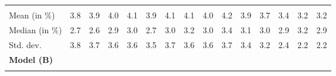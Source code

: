 \begin{tabular}{lllllllllllllll}
  \multicolumn{1}{|r}{} &
  \multicolumn{1}{r}{} &
  \multicolumn{1}{r}{} &
  \multicolumn{1}{r}{} &
  \multicolumn{1}{r}{} &
  \multicolumn{1}{r}{} &
  \multicolumn{1}{r}{} &
  \multicolumn{1}{r}{} &
  \multicolumn{1}{r}{} &
  \multicolumn{1}{r}{} &
  \multicolumn{1}{r}{} &
  \multicolumn{1}{r}{} &
  \multicolumn{1}{r}{} &
  \multicolumn{1}{r}{} \\
\multicolumn{1}{l}{\hspace{2em}Mean (in $\%$)} &
  \multicolumn{1}{|r}{3.8} &
  \multicolumn{1}{r}{3.9} &
  \multicolumn{1}{r}{4.0} &
  \multicolumn{1}{r}{4.1} &
  \multicolumn{1}{r}{3.9} &
  \multicolumn{1}{r}{4.1} &
  \multicolumn{1}{r}{4.1} &
  \multicolumn{1}{r}{4.0} &
  \multicolumn{1}{r}{4.2} &
  \multicolumn{1}{r}{3.9} &
  \multicolumn{1}{r}{3.7} &
  \multicolumn{1}{r}{3.4} &
  \multicolumn{1}{r}{3.2} &
  \multicolumn{1}{r}{3.2} \\
\multicolumn{1}{l}{\hspace{2em}Median (in $\%$)} &
  \multicolumn{1}{|r}{2.7} &
  \multicolumn{1}{r}{2.6} &
  \multicolumn{1}{r}{2.9} &
  \multicolumn{1}{r}{3.0} &
  \multicolumn{1}{r}{2.7} &
  \multicolumn{1}{r}{3.0} &
  \multicolumn{1}{r}{3.2} &
  \multicolumn{1}{r}{3.0} &
  \multicolumn{1}{r}{3.4} &
  \multicolumn{1}{r}{3.1} &
  \multicolumn{1}{r}{3.0} &
  \multicolumn{1}{r}{2.9} &
  \multicolumn{1}{r}{3.2} &
  \multicolumn{1}{r}{2.9} \\
\multicolumn{1}{l}{\hspace{2em}Std. dev.} &
  \multicolumn{1}{|r}{3.8} &
  \multicolumn{1}{r}{3.7} &
  \multicolumn{1}{r}{3.6} &
  \multicolumn{1}{r}{3.6} &
  \multicolumn{1}{r}{3.5} &
  \multicolumn{1}{r}{3.7} &
  \multicolumn{1}{r}{3.6} &
  \multicolumn{1}{r}{3.6} &
  \multicolumn{1}{r}{3.7} &
  \multicolumn{1}{r}{3.4} &
  \multicolumn{1}{r}{3.2} &
  \multicolumn{1}{r}{2.4} &
  \multicolumn{1}{r}{2.2} &
  \multicolumn{1}{r}{2.2} \\ \hline
\multicolumn{1}{l}{{\textbf{Model (B)}}} &
  \multicolumn{1}{|r}{} &
  \multicolumn{1}{r}{} &
  \multicolumn{1}{r}{} &
  \multicolumn{1}{r}{} &
  \multicolumn{1}{r}{} &
  \multicolumn{1}{r}{} &
  \multicolumn{1}{r}{} &
  \multicolumn{1}{r}{} &
  \multicolumn{1}{r}{} &
  \multicolumn{1}{r}{} &
  \multicolumn{1}{r}{} &
  \multicolumn{1}{r}{} &
  \multicolumn{1}{r}{} &
  \multicolumn{1}{r}{} \\ \hline
\multicolumn{1}{l}{\hspace{1em}{\textit{Mult. term} ($\widehat{\tau}^{adv}-1$)}} &
  \multicolumn{1}{|r}{} &
  \multicolumn{1}{r}{} &
  \multicolumn{1}{r}{} &

\end{tabular}
